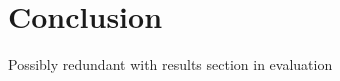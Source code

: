 \documentclass[main.tex]{subfiles}
\begin{document}
\chapter{Conclusion}
Possibly redundant with results section in evaluation
\end{document}
